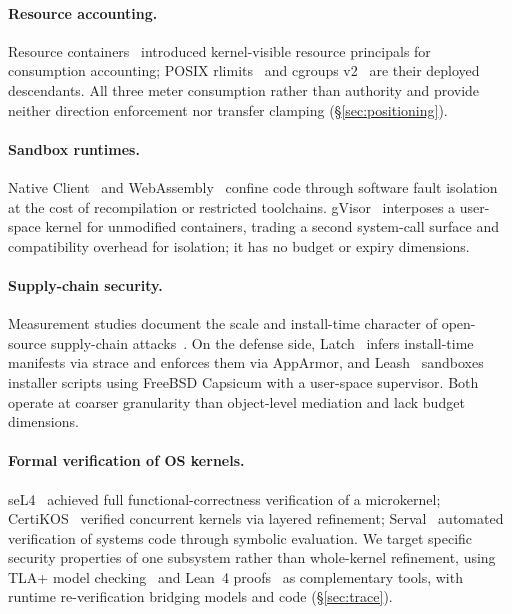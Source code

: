\documentclass[letterpaper,twocolumn,10pt]{article}
\begin{document}
\paragraph{Resource accounting.}
Resource containers~\cite{banga1999rc} introduced kernel-visible
resource principals for consumption accounting; POSIX
rlimits~\cite{setrlimit2017} and cgroups v2~\cite{cgroupsv2} are their
deployed descendants.  All three meter consumption rather than
authority and provide neither direction enforcement nor transfer
clamping (\S\ref{sec:positioning}).

\paragraph{Sandbox runtimes.}
Native Client~\cite{yee2009nacl} and WebAssembly~\cite{haas2017wasm}
confine code through software fault isolation at the cost of
recompilation or restricted toolchains.  gVisor~\cite{gvisor2019}
interposes a user-space kernel for unmodified containers, trading a
second system-call surface and compatibility overhead for isolation;
it has no budget or expiry dimensions.

\paragraph{Supply-chain security.}
Measurement studies document the scale and install-time character of
open-source supply-chain attacks~\cite{ohm2020backstabber,duan2021measuring,zimmermann2019smallworld,ladisa2023taxonomy}.
On the defense side, Latch~\cite{latch2022} infers install-time
manifests via strace and enforces them via AppArmor, and
Leash~\cite{leash2025} sandboxes installer scripts using FreeBSD
Capsicum with a user-space supervisor.  Both operate at coarser
granularity than object-level mediation and lack budget dimensions.

\paragraph{Formal verification of OS kernels.}
seL4~\cite{klein2009sel4} achieved full functional-correctness
verification of a microkernel; CertiKOS~\cite{gu2016certikos} verified
concurrent kernels via layered refinement; Serval~\cite{nelson2019serval}
automated verification of systems code through symbolic evaluation.  We
target specific security properties of one subsystem rather than
whole-kernel refinement, using TLA+ model
checking~\cite{lamport2002specifying} and Lean~4
proofs~\cite{demoura2021lean4} as complementary tools, with runtime
re-verification bridging models and code (\S\ref{sec:trace}).
\end{document}
